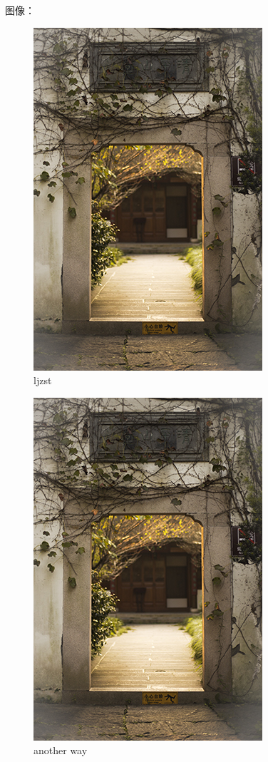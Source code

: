 图像：
\begin{figure}[htb]
	\centering 
	\includegraphics[scale=1.0]{./Pictures/test.jpg} 
	\caption{ljzst} 
\end{figure}

\begin{figure}[htb]
	\centering 
	\includegraphics[scale=1.0]{./Pictures/test.jpg} 
	\caption{another way} 
\end{figure}

